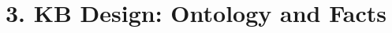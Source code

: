 \documentclass[a4paper,9pt]{beamer}
\begin{document}
\section{3. KB Design: Ontology and Facts}
\end{document}
